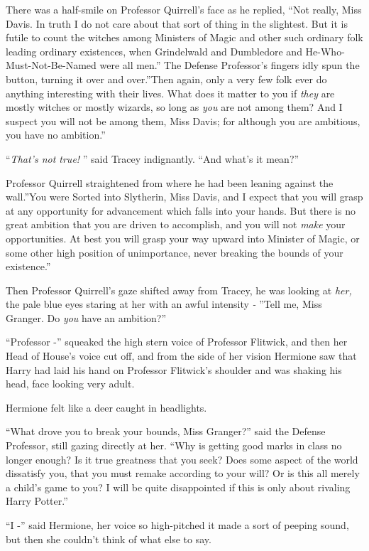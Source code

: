 There was a half-smile on Professor Quirrell's face as he replied, ``Not
really, Miss Davis. In truth I do not care about that sort of thing in
the slightest. But it is futile to count the witches among Ministers of
Magic and other such ordinary folk leading ordinary existences, when
Grindelwald and Dumbledore and He-Who-Must-Not-Be-Named were all men.''
The Defense Professor's fingers idly spun the button, turning it over
and over.''Then again, only a very few folk ever do anything interesting
with their lives. What does it matter to you if \emph{they} are mostly
witches or mostly wizards, so long as \emph{you} are not among them? And
I suspect you will not be among them, Miss Davis; for although you are
ambitious, you have no ambition.''

``\emph{That's not true!} '' said Tracey indignantly. ``And what's it
mean?''

Professor Quirrell straightened from where he had been leaning against
the wall.''You were Sorted into Slytherin, Miss Davis, and I expect that
you will grasp at any opportunity for advancement which falls into your
hands. But there is no great ambition that you are driven to accomplish,
and you will not \emph{make} your opportunities. At best you will grasp
your way upward into Minister of Magic, or some other high position of
unimportance, never breaking the bounds of your existence.''

Then Professor Quirrell's gaze shifted away from Tracey, he was looking
at \emph{her,} the pale blue eyes staring at her with an awful intensity
\emph{-} ''Tell me, Miss Granger. Do \emph{you} have an ambition?''

``Professor -'' squeaked the high stern voice of Professor Flitwick, and
then her Head of House's voice cut off, and from the side of her vision
Hermione saw that Harry had laid his hand on Professor Flitwick's
shoulder and was shaking his head, face looking very adult.

Hermione felt like a deer caught in headlights.

``What drove you to break your bounds, Miss Granger?'' said the Defense
Professor, still gazing directly at her. ``Why is getting good marks in
class no longer enough? Is it true greatness that you seek? Does some
aspect of the world dissatisfy you, that you must remake according to
your will? Or is this all merely a child's game to you? I will be quite
disappointed if this is only about rivaling Harry Potter.''

``I -'' said Hermione, her voice so high-pitched it made a sort of
peeping sound, but then she couldn't think of what else to say.

